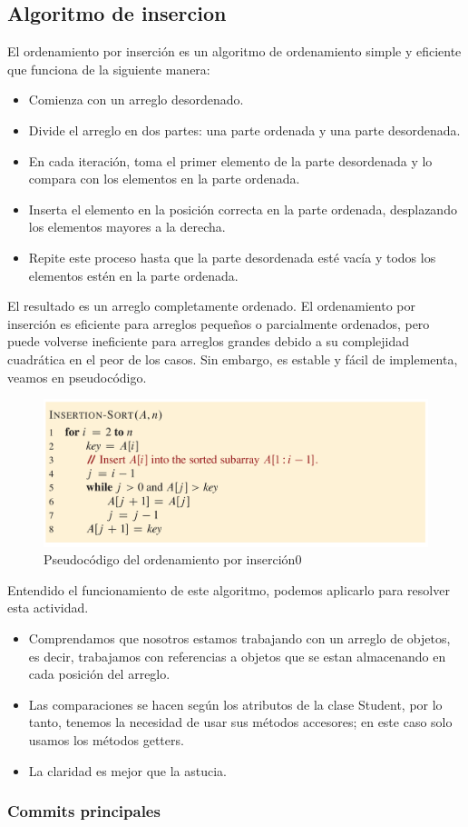 \subsection{Algoritmo de insercion}
\begin{itemize}
  El ordenamiento por inserción es un algoritmo de ordenamiento simple y eficiente que funciona de la siguiente manera:
  \begin{itemize}
    \item Comienza con un arreglo desordenado.
    \item Divide el arreglo en dos partes: una parte ordenada y una parte desordenada.
    \item En cada iteración, toma el primer elemento de la parte desordenada y lo compara con los elementos en la parte ordenada.
    \item Inserta el elemento en la posición correcta en la parte ordenada, desplazando los elementos mayores a la derecha.
    \item Repite este proceso hasta que la parte desordenada esté vacía y todos los elementos estén en la parte ordenada.
  \end{itemize}
  El resultado es un arreglo completamente ordenado. El ordenamiento por inserción es eficiente para arreglos pequeños o parcialmente ordenados, pero puede volverse ineficiente para arreglos grandes debido a su complejidad cuadrática en el peor de los casos. Sin embargo, es estable y fácil de implementa, veamos en pseudocódigo.
\end{itemize}

\begin{figure}
  \centering
  \includegraphics{../img/pseudocodigo_insercion.png}
  \caption{Pseudocódigo del ordenamiento por inserción0}
  \label{fig:nombre_etiqueta}
\end{figure}

\begin{itemize}
  Entendido el funcionamiento de este algoritmo, podemos aplicarlo para resolver esta actividad. 
  \begin{itemize}
    \item Comprendamos que nosotros estamos trabajando con un arreglo de objetos, es decir, trabajamos con referencias a objetos que se estan almacenando en cada posición del arreglo.
    \item Las comparaciones se hacen según los atributos de la clase Student, por lo tanto, tenemos la necesidad de usar sus métodos accesores; en este caso solo usamos los métodos getters.
    \item La claridad es mejor que la astucia.
  \end{itemize}
\end{itemize}

\subsubsection{Commits principales}

